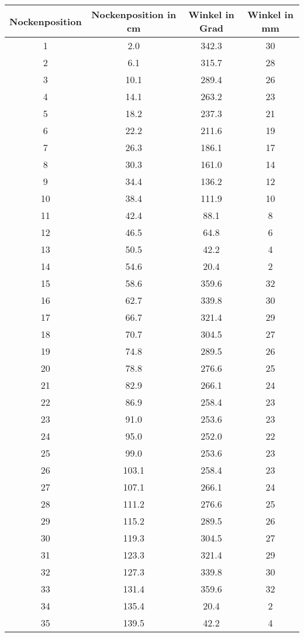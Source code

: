 \documentclass[10pt, a4paper]{article}
\begin{document}
\begin{center}
	\begin{tabular}{c|c|c|c}
		Nockenposition & Nockenposition in cm & Winkel in Grad & Winkel in mm \\
		\hline
		1 & 2.0 & 342.3 & 30 \\
		2 & 6.1 & 315.7 & 28 \\
		3 & 10.1 & 289.4 & 26 \\
		4 & 14.1 & 263.2 & 23 \\
		5 & 18.2 & 237.3 & 21 \\
		6 & 22.2 & 211.6 & 19 \\
		7 & 26.3 & 186.1 & 17 \\
		8 & 30.3 & 161.0 & 14 \\
		9 & 34.4 & 136.2 & 12 \\
		10 & 38.4 & 111.9 & 10 \\
		11 & 42.4 & 88.1 & 8 \\
		12 & 46.5 & 64.8 & 6 \\
		13 & 50.5 & 42.2 & 4 \\
		14 & 54.6 & 20.4 & 2 \\
		15 & 58.6 & 359.6 & 32 \\
		16 & 62.7 & 339.8 & 30 \\
		17 & 66.7 & 321.4 & 29 \\
		18 & 70.7 & 304.5 & 27 \\
		19 & 74.8 & 289.5 & 26 \\
		20 & 78.8 & 276.6 & 25 \\
		21 & 82.9 & 266.1 & 24 \\
		22 & 86.9 & 258.4 & 23 \\
		23 & 91.0 & 253.6 & 23 \\
		24 & 95.0 & 252.0 & 22 \\
		25 & 99.0 & 253.6 & 23 \\
		26 & 103.1 & 258.4 & 23 \\
		27 & 107.1 & 266.1 & 24 \\
		28 & 111.2 & 276.6 & 25 \\
		29 & 115.2 & 289.5 & 26 \\
		30 & 119.3 & 304.5 & 27 \\
		31 & 123.3 & 321.4 & 29 \\
		32 & 127.3 & 339.8 & 30 \\
		33 & 131.4 & 359.6 & 32 \\
		34 & 135.4 & 20.4 & 2 \\
		35 & 139.5 & 42.2 & 4 \\

\end{tabular}
\end{center}
\end{document}
